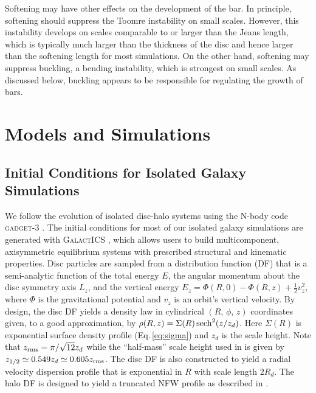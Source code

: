 Softening may have other effects on the development of the bar.  In
principle, softening should suppress the Toomre instability on small
scales.  However, this instability develops on scales comparable to or
larger than the Jeans length, which is typically much larger than the
thickness of the disc and hence larger than the softening length for
most simulations.  On the other hand, softening may suppress buckling,
a bending instability, which is strongest on small scales.  As
discussed below, buckling appears to be responsible for regulating the
growth of bars.

\section{Models and Simulations} \label{sec:thick_discs_suppress}

\subsection{Initial Conditions for Isolated Galaxy Simulations} \label{sssec:isolated}

We follow the evolution of isolated disc-halo systems using the N-body
code \textsc{gadget-3} \citep{GadgetCodePaper}.  The initial
conditions for most of our isolated galaxy simulations are generated
with \textsc{GalactICS} \citep{GalactICS1995,WPDGalactICSReference},
which allows users to build multicomponent, axisymmetric equilibrium
systems with prescribed structural and kinematic properties.  Disc
particles are sampled from a distribution function (DF) that is a
semi-analytic function of the total energy $E$, the angular momentum
about the disc symmetry axis $L_z$, and the vertical energy {$E_z = \Phi(R,0) - \Phi(R,z) + \frac{1}{2} v_z^2$, where $\Phi$ is the gravitational potential and $v_z$ is an orbit's vertical velocity. } By
design, the disc DF yields a density law in cylindrical $\left
(R,\,\phi,\,z\right )$ coordinates given, to a good approximation, by
$\rho(R,z) = \Sigma(R)\,{\rm sech}^2(z/z_d)$.  Here $\Sigma(R)$ is
exponential surface density profile (Eq.\,\ref{eq:sigma}) and $z_d$ is
the scale height. Note that $z_{\rm rms} = \pi/\sqrt{12} z_d$ while the
``half-mass'' scale height used in \citet{YurinSpringelStellarDisks}
is given by $z_{1/2} \simeq 0.549z_d \simeq 0.605 z_{\rm rms}$.  The disc DF
is also constructed to yield a radial velocity dispersion profile that
is exponential in $R$ with scale length $2R_d$. The halo DF is
designed to yield a truncated NFW profile \citep{NFW} as described in
\citet{WPDGalactICSReference}.

